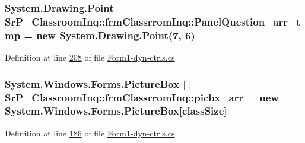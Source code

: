 \hypertarget{class_sr_p___classroom_inq_1_1frm_classrrom_inq_a3e546b9b0c603a788d0316efe572c960}{
\subsubsection[{\-Panel\-Question\-\_\-arr\-\_\-tmp}]{\setlength{\rightskip}{0pt plus 5cm}\-System.\-Drawing.\-Point {\bf \-Sr\-P\-\_\-\-Classroom\-Inq\-::frm\-Classrrom\-Inq\-::\-Panel\-Question\-\_\-arr\-\_\-tmp} = new \-System.\-Drawing.\-Point(7, 6)}}
\label{class_sr_p___classroom_inq_1_1frm_classrrom_inq_a3e546b9b0c603a788d0316efe572c960}


\-Definition at line \hyperlink{_form1-dyn-ctrls_8cs_source_l00208}{208} of file \hyperlink{_form1-dyn-ctrls_8cs_source}{\-Form1-\/dyn-\/ctrls.\-cs}.

\hypertarget{class_sr_p___classroom_inq_1_1frm_classrrom_inq_a067a85853fc3e38cf6343917c4fb061a}{
\subsubsection[{picbx\-\_\-arr}]{\setlength{\rightskip}{0pt plus 5cm}\-System.\-Windows.\-Forms.\-Picture\-Box \mbox{[}$\,$\mbox{]} {\bf \-Sr\-P\-\_\-\-Classroom\-Inq\-::frm\-Classrrom\-Inq\-::picbx\-\_\-arr} = new \-System.\-Windows.\-Forms.\-Picture\-Box\mbox{[}{\bf class\-Size}\mbox{]}}}
\label{class_sr_p___classroom_inq_1_1frm_classrrom_inq_a067a85853fc3e38cf6343917c4fb061a}


\-Definition at line \hyperlink{_form1-dyn-ctrls_8cs_source_l00186}{186} of file \hyperlink{_form1-dyn-ctrls_8cs_source}{\-Form1-\/dyn-\/ctrls.\-cs}.

